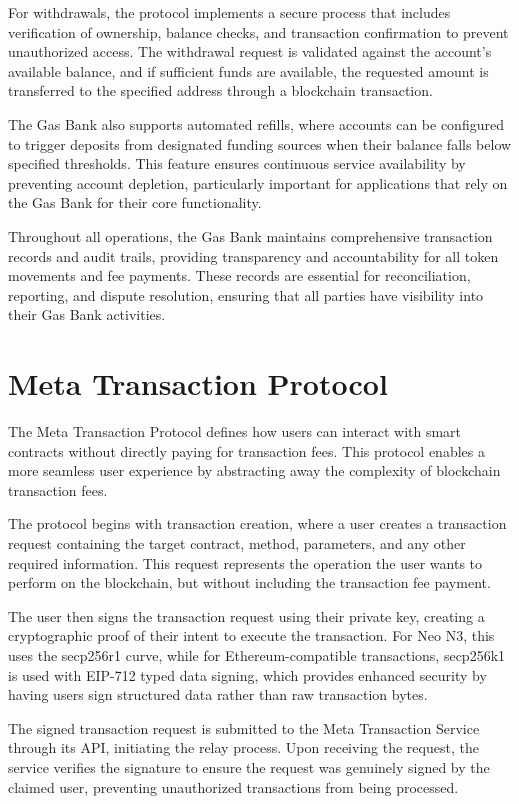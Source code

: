 \documentclass[11pt]{article}
\begin{document}
For withdrawals, the protocol implements a secure process that includes verification of ownership, balance checks, and transaction confirmation to prevent unauthorized access. The withdrawal request is validated against the account's available balance, and if sufficient funds are available, the requested amount is transferred to the specified address through a blockchain transaction.

The Gas Bank also supports automated refills, where accounts can be configured to trigger deposits from designated funding sources when their balance falls below specified thresholds. This feature ensures continuous service availability by preventing account depletion, particularly important for applications that rely on the Gas Bank for their core functionality.

Throughout all operations, the Gas Bank maintains comprehensive transaction records and audit trails, providing transparency and accountability for all token movements and fee payments. These records are essential for reconciliation, reporting, and dispute resolution, ensuring that all parties have visibility into their Gas Bank activities.

\section{Meta Transaction Protocol}
\label{subsec:meta-tx-protocol-spec}

The Meta Transaction Protocol defines how users can interact with smart contracts without directly paying for transaction fees. This protocol enables a more seamless user experience by abstracting away the complexity of blockchain transaction fees.


The protocol begins with transaction creation, where a user creates a transaction request containing the target contract, method, parameters, and any other required information. This request represents the operation the user wants to perform on the blockchain, but without including the transaction fee payment.

The user then signs the transaction request using their private key, creating a cryptographic proof of their intent to execute the transaction. For Neo N3, this uses the secp256r1 curve, while for Ethereum-compatible transactions, secp256k1 is used with EIP-712 typed data signing, which provides enhanced security by having users sign structured data rather than raw transaction bytes.

The signed transaction request is submitted to the Meta Transaction Service through its API, initiating the relay process. Upon receiving the request, the service verifies the signature to ensure the request was genuinely signed by the claimed user, preventing unauthorized transactions from being processed.
\end{document}
